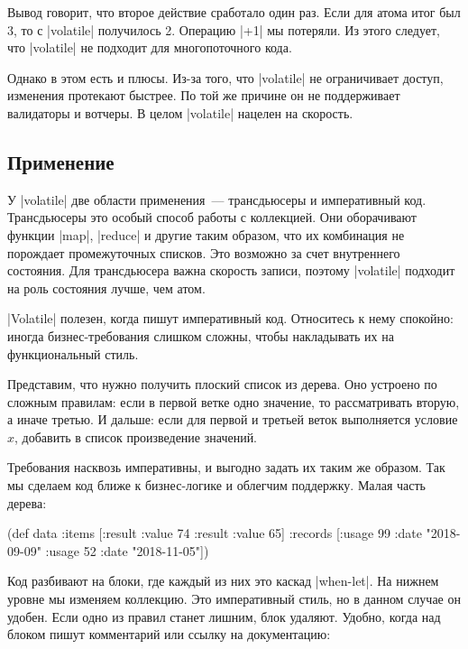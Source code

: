 Вывод говорит, что второе действие сработало один раз. Если для атома итог был
3, то с \spverb|volatile| получилось 2. Операцию \spverb|+1| мы потеряли. Из
этого следует, что \spverb|volatile| не подходит для многопоточного кода.

Однако в этом есть и плюсы. Из-за того, что \spverb|volatile| не ограничивает
доступ, изменения протекают быстрее. По той же причине он не поддерживает
валидаторы и вотчеры. В целом \spverb|volatile| нацелен на скорость.

\subsection{Применение}

У \spverb|volatile| две области применения~--- трансдьюсеры и императивный
код. Трансдьюсеры это особый способ работы с коллекцией. Они оборачивают функции
\spverb|map|, \spverb|reduce| и другие таким образом, что их комбинация не
порождает промежуточных списков. Это возможно за счет внутреннего состояния. Для
трансдьюсера важна скорость записи, поэтому \spverb|volatile| подходит на роль
состояния лучше, чем атом.

\spverb|Volatile| полезен, когда пишут императивный код. Относитесь к нему
спокойно: иногда бизнес-требования слишком сложны, чтобы накладывать их на
функциональный стиль.

Представим, что нужно получить плоский список из дерева. Оно устроено по сложным
правилам: если в первой ветке одно значение, то рассматривать вторую, а иначе
третью. И дальше: если для первой и третьей веток выполняется условие $x$,
добавить в список произведение значений.

Требования насквозь императивны, и выгодно задать их таким же образом. Так мы
сделаем код ближе к бизнес-логике и облегчим поддержку. Малая часть дерева:

\begin{english}
  \begin{clojure}
(def data
  {:items [{:result {:value 74}}
           {:result {:value 65}}]
   :records [{:usage 99 :date "2018-09-09"}
             {:usage 52 :date "2018-11-05"}]})
  \end{clojure}
\end{english}

Код разбивают на блоки, где каждый из них это каскад \spverb|when-let|. На
нижнем уровне мы изменяем коллекцию. Это императивный стиль, но в данном случае
он удобен. Если одно из правил станет лишним, блок удаляют. Удобно, когда над
блоком пишут комментарий или ссылку на документацию:

